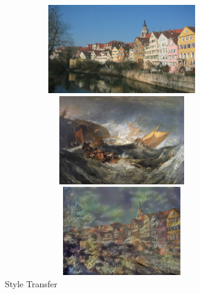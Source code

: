 \documentclass{article}
\begin{document}
\begin{figure}
\centering
\caption{Style Transfer}
\label{fig:style-transfer}

    \begin{minipage}{0.45\linewidth}
    \centering
    \includegraphics[width=0.9\textwidth,height=1.5in]{img/content/tubingen}
    \end{minipage}

\medskip

    \begin{minipage}{0.45\linewidth}
    \centering
    \includegraphics[width=0.9\textwidth,height=1.5in]{img/artworks/the-shipwreck-of-the-minotaur}
    \end{minipage}
    \begin{minipage}{0.45\linewidth}
    \centering
    \includegraphics[width=0.9\textwidth,height=1.5in]{img/transfer/the-shipwreck-of-the-minotaur}
    \end{minipage}

\medskip


\end{figure}
\end{document}
